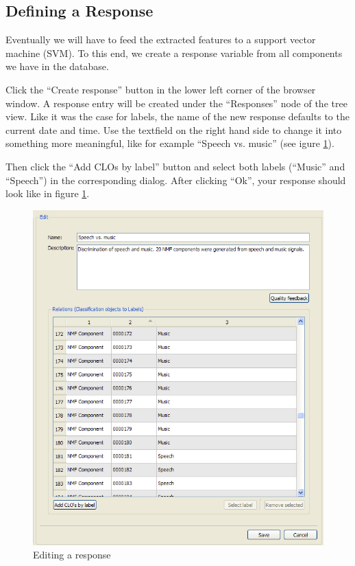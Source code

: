 \subsection{Defining a Response}

Eventually we will have to feed the extracted features to a support vector
machine (SVM). To this end, we create a response variable from all components we
have in the database.

Click the ``Create response'' button in the lower left corner of the browser
window. A response entry will be created under the ``Responses'' node of the
tree view. Like it was the case for labels, the name of the new response
defaults to the current date and time. Use the textfield on the right hand side
to change it into something more meaningful, like for example ``Speech
vs. music'' (see igure \ref{figure:TutorialEditResponse}).

Then click the ``Add CLOs by label'' button and select both labels (``Music''
and ``Speech'') in the corresponding dialog. After clicking ``Ok'', your
response should look like in figure \ref{figure:TutorialEditResponse}.

\begin{figure}
    \centering
    \includegraphics[width=\textwidth]{tutorial-media/EditResponse.png}
    \caption{%
        \label{figure:TutorialEditResponse}%
        Editing a response
    }
\end{figure}



